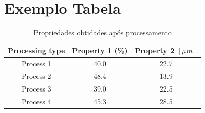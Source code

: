 \section{Exemplo Tabela}

\begin{table}[h]
	\centering
	\label{tab01}
	
	\begin{tabular}{ccc}
		\toprule
		\textbf{Processing type} & \textbf{Property 1} (\%) & 
		\textbf{Property 2} $[\mu m]$ \\
		\midrule
		Process 1 & 40.0 & 22.7 \\
		Process 2 & 48.4 & 13.9 \\
		Process 3 & 39.0 & 22.5 \\
		Process 4 & 45.3 & 28.5 \\
		\bottomrule
	\end{tabular}

	\caption{Propriedades obtidades após processamento}
\end{table}





